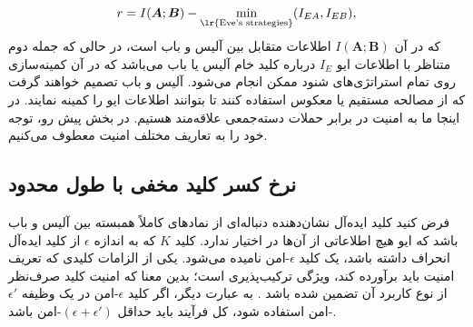 \begin{equation}
	r = I(\bm{A}; \bm{B}) - \min_{\text{\lr{Eve's strategies}}} (I_{EA}, I_{EB}),
	\label{eq:8-18}
\end{equation}
که در آن $I(\bm{A}; \bm{B})$ اطلاعات متقابل بین آلیس و باب است، در حالی که جمله دوم متناظر با اطلاعات ایو $I_E$ درباره کلید خام آلیس یا باب می‌باشد که در آن کمینه‌سازی روی تمام استراتژی‌های شنود ممکن انجام می‌شود. آلیس و باب تصمیم خواهند گرفت که از مصالحه مستقیم یا معکوس استفاده کنند تا بتوانند اطلاعات ایو را کمینه نمایند. در اینجا ما به امنیت در برابر حملات دسته‌جمعی علاقه‌مند هستیم. در بخش پیش‌ رو، توجه خود را به تعاریف مختلف امنیت معطوف می‌کنیم.





\subsection{نرخ کسر کلید مخفی با طول محدود}
\label{subsec:8-2-1}
فرض کنید کلید ایده‌آل نشان‌دهنده دنباله‌ای از نمادهای کاملاً همبسته بین آلیس و باب باشد که ایو هیچ اطلاعاتی از آن‌ها در اختیار ندارد. کلید $K$ که به اندازه $\epsilon$ از کلید ایده‌آل انحراف داشته باشد، یک کلید $\epsilon$-امن نامیده می‌شود. یکی از الزامات کلیدی که تعریف امنیت باید برآورده کند، ویژگی ترکیب‌پذیری است؛ بدین معنا که امنیت کلید صرف‌نظر از نوع کاربرد آن تضمین شده باشد \cite{8-8, 8-25, 8-26, 8-27, 8-28, 8-29}. به عبارت دیگر، اگر کلید $\epsilon$-امن در یک وظیفه $\epsilon'$-امن استفاده شود، کل فرآیند باید حداقل $(\epsilon + \epsilon')$-امن باشد.

